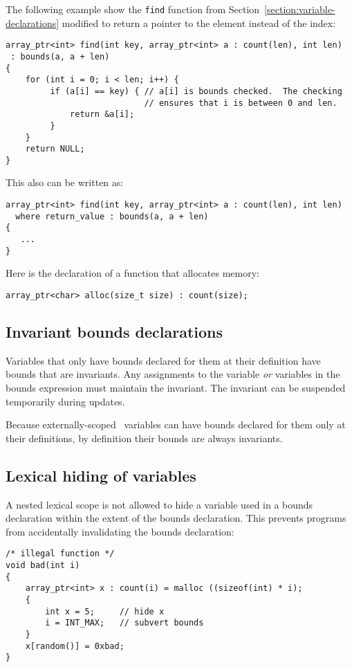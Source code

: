 The following example show the \texttt{find} function from
Section~\ref{section:variable-declarations} modified
to return a pointer to the element instead of the index:

\begin{verbatim}
array_ptr<int> find(int key, array_ptr<int> a : count(len), int len)
 : bounds(a, a + len)
{
    for (int i = 0; i < len; i++) {
         if (a[i] == key) { // a[i] is bounds checked.  The checking
                            // ensures that i is between 0 and len.
             return &a[i];
         }
    }
    return NULL;
}
\end{verbatim}

This also can be written as:

\begin{verbatim}
array_ptr<int> find(int key, array_ptr<int> a : count(len), int len)
  where return_value : bounds(a, a + len)
{
   ...
}
\end{verbatim}
Here is the declaration of a function that allocates memory:

\begin{verbatim}
array_ptr<char> alloc(size_t size) : count(size);
\end{verbatim}

\subsection{Invariant bounds declarations}
\label{section:invariant-bounds-declarations}

Variables that only have bounds declared for them at their definition
have bounds that are invariants. Any assignments to the variable
\emph{or} variables in the bounds expression must maintain the
invariant. The invariant can be suspended temporarily during updates.

Because externally-scoped \arrayptr\ variables can have bounds declared
for them only at their definitions, by definition their bounds are
always invariants.

\subsection{Lexical hiding of variables}

A nested lexical scope is not allowed to hide a variable used in a
bounds declaration within the extent of the bounds declaration. This
prevents programs from accidentally invalidating the bounds declaration:

\begin{verbatim}
/* illegal function */
void bad(int i) 
{
    array_ptr<int> x : count(i) = malloc ((sizeof(int) * i);
    {
        int x = 5;     // hide x
        i = INT_MAX;   // subvert bounds
    }
    x[random()] = 0xbad;
}
\end{verbatim}

